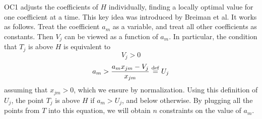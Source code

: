 OC1 adjusts the coefficients of $H$ individually, finding a locally
optimal value for one coefficient at a time.  This key idea was
introduced by Breiman et al.  It works as follows.  Treat the
coefficient $a_m$ as a variable, and treat all other coefficients as
constants.  Then $V_j$ can be viewed as a function of $a_m$. 
In particular, the condition that $T_j$ is above $H$ is equivalent
to 
\[   V_j > 0  \]
\begin{equation}
\label{equation:uj}
   a_m > \frac{a_m x_{jm} - V_j}{x_{jm}} \stackrel{\rm def}{=} U_j 
\end{equation}
assuming that $x_{jm} > 0$, which we ensure by normalization.  Using
this definition of $U_j$, the point $T_j$ is above $H$ if $a_m > U_j$,
and below otherwise.  By plugging all the points from $T$ into this
equation, we will obtain $n$ constraints on the value of $a_m$.

